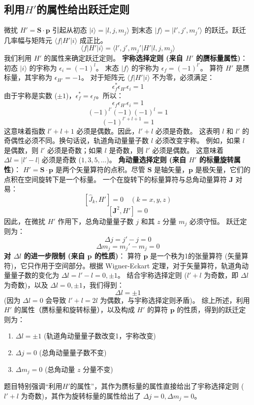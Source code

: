 \documentclass[12pt, a4paper]{article}
\begin{document}
\subsection{利用\(H'\)的属性给出跃迁定则}
微扰 \(H' = \mathbf{S} \cdot \mathbf{p}\) 引起从初态 \(|i\rangle = |l, j, m_j\rangle\) 到末态 \(|f\rangle = |l', j', m_j'\rangle\) 的跃迁。跃迁几率幅与矩阵元 \(\langle f | H' | i \rangle\) 成正比。
\[ \langle f | H' | i \rangle = \langle l', j', m_j' | H' | l, j, m_j \rangle \]
我们利用 \(H'\) 的属性来确定跃迁定则。
\textbf{宇称选择定则 (来自 \(H'\) 的赝标量属性)}：
初态 \(|i\rangle\) 的宇称为 \(\epsilon_i = (-1)^l\)。
末态 \(|f\rangle\) 的宇称为 \(\epsilon_f = (-1)^{l'}\)。
算符 \(H'\) 是赝标量，其宇称为 \(\epsilon_{H'} = -1\)。
对于矩阵元 \(\langle f | H' | i \rangle\) 不为零，必须满足：
\[ \epsilon_f^* \epsilon_{H'} \epsilon_i = 1 \]
由于宇称是实数 (\(\pm 1\))，\(\epsilon_f^* = \epsilon_f\)。所以：
\[ \epsilon_f \epsilon_{H'} \epsilon_i = 1 \]
\[ (-1)^{l'} (-1) (-1)^l = 1 \]
\[ (-1)^{l' + l + 1} = 1 \]
这意味着指数 \(l' + l + 1\) 必须是偶数。因此，\(l' + l\) 必须是奇数。
这表明 \(l\) 和 \(l'\) 的奇偶性必须不同。换句话说，轨道角动量量子数 \(l\) 必须改变宇称。
例如，如果 \(l\) 是偶数，则 \(l'\) 必须是奇数；如果 \(l\) 是奇数，则 \(l'\) 必须是偶数。
这意味着 \(\Delta l = |l' - l|\) 必须是奇数 (\(1, 3, 5, \dots\))。
\textbf{角动量选择定则 (来自 \(H'\) 的标量旋转属性)}：
\(H' = \mathbf{S} \cdot \mathbf{p}\) 是两个矢量算符的点积。尽管 \(\mathbf{S}\) 是轴矢量，\(\mathbf{p}\) 是极矢量，它们的点积在空间旋转下是一个标量。
一个在旋转下的标量算符与总角动量算符 \(\mathbf{J}\) 对易：
\[ [\hat{J}_k, H'] = 0 \quad (k=x,y,z) \]
\[ [\mathbf{J}^2, H'] = 0 \]
因此，在微扰 \(H'\) 作用下，总角动量量子数 \(j\) 和其 \(z\) 分量 \(m_j\) 必须守恒。
跃迁定则为：
\[ \Delta j = j' - j = 0 \]
\[ \Delta m_j = m_j' - m_j = 0 \]
\textbf{对 \(\Delta l\) 的进一步限制 (来自 \(\mathbf{p}\) 的性质)}：
算符 \(\mathbf{p}\) 是一个秩为1的张量算符 (矢量算符)，它只作用于空间部分。根据 Wigner-Eckart 定理，对于矢量算符，轨道角动量量子数的变化为 \(\Delta l = l' - l = 0, \pm 1\)。
结合宇称选择定则 (\(l' + l\) 为奇数，即 \(\Delta l\) 为奇数)，以及 \(\Delta l = 0, \pm 1\)，我们得到：
\[ \Delta l = \pm 1 \]
(因为 \(\Delta l = 0\) 会导致 \(l'+l = 2l\) 为偶数，与宇称选择定则矛盾)。
综上所述，利用 \(H'\) 的属性（赝标量和旋转标量），以及构成 \(H'\) 的算符 \(\mathbf{p}\) 的性质，得到的跃迁定则为：
\begin{enumerate}
    \item \(\Delta l = \pm 1\) (轨道角动量量子数改变1，宇称改变)
    \item \(\Delta j = 0\) (总角动量量子数不变)
    \item \(\Delta m_j = 0\) (总角动量 \(z\) 分量不变)
\end{enumerate}
题目特别强调“利用\(H'\)的属性”，其作为赝标量的属性直接给出了宇称选择定则 (\(l'+l\) 为奇数)，其作为旋转标量的属性给出了 \(\Delta j=0, \Delta m_j=0\)。
\end{document}
